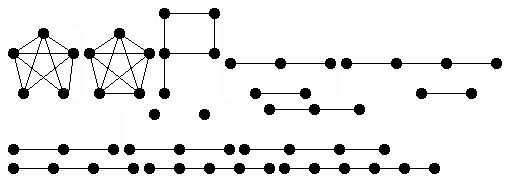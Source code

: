\documentclass[11pt,paper=b5,footinclude,headinclude]{scrbook} %
\theoremstyle{remark}
\theoremstyle{definition} %
\theoremstyle{theorem} %
\begin{document}
\includegraphics[scale=0.5,frame]{smallGraphs/g_K5-e.png}     
\includegraphics[scale=0.5,frame]{smallGraphs/g_K5.png}     
\includegraphics[scale=0.5,frame]{smallGraphs/g_P.png}     
\includegraphics[scale=0.5,frame]{smallGraphs/g_P2UP3.png}     
\includegraphics[scale=0.5,frame]{smallGraphs/g_P2UP4.png}     
\includegraphics[scale=0.5,frame]{smallGraphs/g_P3.png}     
\includegraphics[scale=0.5,frame]{smallGraphs/g_P3U2K1.png}     
\includegraphics[scale=0.5,frame]{smallGraphs/g_P3UP4.png}     
\includegraphics[scale=0.5,frame]{smallGraphs/g_P4.png}     
\includegraphics[scale=0.5,frame]{smallGraphs/g_P5.png}     
\includegraphics[scale=0.5,frame]{smallGraphs/g_P6.png}     
\end{document}

